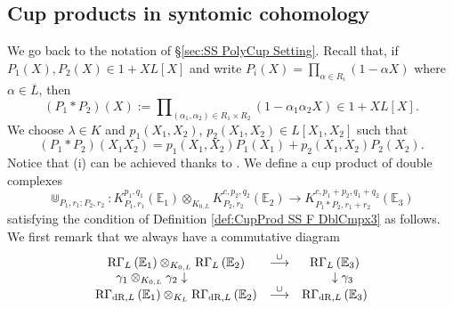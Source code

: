 \documentclass[asterisque,english]{smfart}
\begin{document}
\subsection{Cup products in syntomic cohomology}
We go back to the notation of \S \ref{sec:SS PolyCup Setting}. 
Recall that, if $P_{1}\left( X\right) ,P_{2}\left( X\right) \in 1+XL\left[ X
\right] $ and write $P_{i}\left( X\right) =\prod\nolimits_{\alpha \in R_{i}}\left( 1-\alpha
X\right)$ where $\alpha \in \overline{L}$, then
$$
\left( P_{1}\ast P_{2}\right) \left( X\right) :=\prod\nolimits_{\left(
\alpha _{1},\alpha _{2}\right) \in R_{1}\times R_{2}}\left( 1-\alpha
_{1}\alpha _{2}X\right) \in 1+X L\left[ X\right] .
$$We choose $\lambda \in K$ and  $
p_{1}\left( X_{1},X_{2}\right)$, $p_{2}\left( X_{1},X_{2}\right) \in L\left[
X_{1},X_{2}\right] $ such that
\begin{equation}
\left( P_{1}\ast P_{2}\right) \left( X_{1}X_{2}\right) =p_{1}\left(
X_{1},X_{2}\right) P_{1}\left( X_{1}\right) +p_{2}\left( X_{1},X_{2}\right)
P_{2}\left( X_{2}\right).  \label{CupProd F1}
\end{equation}
Notice that (i) can be achieved thanks to \cite[Lemma 4.2]{Bes00}. We define a  cup product of double complexes
\begin{equation*}
\Cup _{P_{1},r_{1};P_{2},r_{2}}\colon K_{P_{1},r_{1}}^{p_{1},q_{1}}\left( 
\mathbb{E}_{1}\right) \otimes
_{K_{0,L}}K_{P_{2},r_{2}}^{c,p_{2},q_{2}}\left( \mathbb{E}_{2}\right)
\rightarrow K_{P_{1}\ast
P_{2},r_{1}+r_{2}}^{c,p_{1}+p_{2},q_{1}+q_{2}}\left( \mathbb{E}_{3}\right)
\end{equation*}
satisfying the condition of Definition \ref{def:CupProd SS F DblCmpx3}  as
follows. We first remark that we always have a commutative diagram
\begin{equation*}
\begin{array}{ccc}
\mathrm{R}\Gamma _{L}\left( \mathbb{E}_{1}\right) \otimes _{K_{0,L}}\mathrm{R}\Gamma
_{L}\left( \mathbb{E}_{2}\right) & \overset{\cup }{\longrightarrow } & 
\mathrm{R}\Gamma _{L}\left( \mathbb{E}_{3}\right) \\ 
\gamma _{1}\otimes _{K_{0,L}}\gamma _{2}\downarrow \text{ \ \ \ \ \ \ \ \ \
\ } &  & \text{ \ \ }\downarrow \gamma _{3} \\ 
\mathrm{R}\Gamma _{\mathrm{dR},L}\left( \mathbb{E}_{1}\right) \otimes
_{K_{L}}\mathrm{R}\Gamma_{\mathrm{dR},L}\left( \mathbb{E}_{2}\right) & \overset{
\cup }{\longrightarrow } & \mathrm{R}\Gamma_{\mathrm{dR},L}\left( \mathbb{E}_{3}\right)
\end{array}
\end{equation*}
\end{document}
